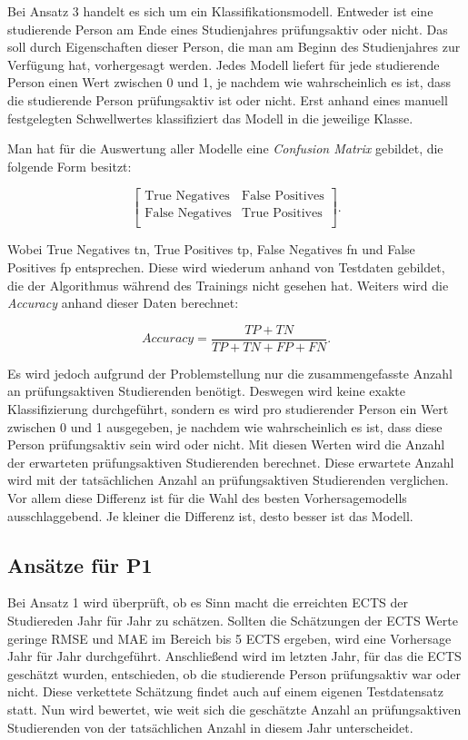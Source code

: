 Bei Ansatz 3 handelt es sich um ein Klassifikationsmodell. Entweder ist eine studierende Person am Ende eines Studienjahres pr\"ufungsaktiv oder nicht. Das soll
durch Eigenschaften dieser Person, die man am Beginn des Studienjahres zur Verf\"ugung hat, vorhergesagt werden. Jedes Modell liefert f\"ur jede studierende Person
einen Wert zwischen 0 und 1, je nachdem wie wahrscheinlich es ist, dass die studierende Person pr\"ufungsaktiv ist oder nicht. Erst anhand eines manuell festgelegten
Schwellwertes klassifiziert das Modell in die jeweilige Klasse.

Man hat f\"ur die Auswertung aller Modelle eine \textit{Confusion Matrix} gebildet, die folgende Form besitzt:

$$ \left[ \begin{array}{rr} \text{True Negatives} & \text{False Positives}  \\  \text{False Negatives} & \text{True Positives} \\  \end{array}\right] .$$

Wobei True Negatives \gls{tn}, True Positives \gls{tp}, False Negatives \gls{fn} und False Positives \gls{fp} entsprechen.
Diese wird wiederum anhand von Testdaten gebildet, die der Algorithmus w\"ahrend des Trainings nicht gesehen hat. Weiters wird die \textit{Accuracy} anhand dieser Daten berechnet:

$$ Accuracy = \frac{TP + TN}{TP + TN + FP + FN}.$$

Es wird jedoch aufgrund der Problemstellung nur die zusammengefasste Anzahl an pr\"ufungsaktiven Studierenden ben\"otigt. Deswegen wird keine exakte Klassifizierung durchgef\"uhrt,
sondern es wird pro studierender Person ein Wert zwischen 0 und 1 ausgegeben, je nachdem wie wahrscheinlich es ist, dass diese Person pr\"ufungsaktiv sein wird oder nicht.
Mit diesen Werten wird die Anzahl der erwarteten pr\"ufungsaktiven Studierenden berechnet.
Diese erwartete Anzahl wird mit der tats\"achlichen Anzahl an pr\"ufungsaktiven Studierenden verglichen.
Vor allem diese Differenz ist f\"ur die Wahl des besten Vorhersagemodells ausschlaggebend. Je kleiner die Differenz ist, desto besser ist das Modell.



\subsection{Ans\"atze f\"ur P1}
Bei Ansatz 1 wird \"uberpr\"uft, ob es Sinn macht die erreichten ECTS der Studiereden Jahr f\"ur Jahr zu sch\"atzen. Sollten die Sch\"atzungen der
ECTS Werte geringe RMSE und MAE im Bereich bis 5 ECTS ergeben, wird eine Vorhersage Jahr f\"ur Jahr durchgef\"uhrt.
Anschlie{\ss}end wird im letzten Jahr, f\"ur das die ECTS gesch\"atzt wurden, entschieden, ob die studierende Person pr\"ufungsaktiv war oder nicht.
Diese verkettete Sch\"atzung findet auch auf einem eigenen Testdatensatz statt. Nun wird bewertet, wie weit sich die gesch\"atzte Anzahl an pr\"ufungsaktiven
Studierenden von der tats\"achlichen Anzahl in diesem Jahr unterscheidet.

